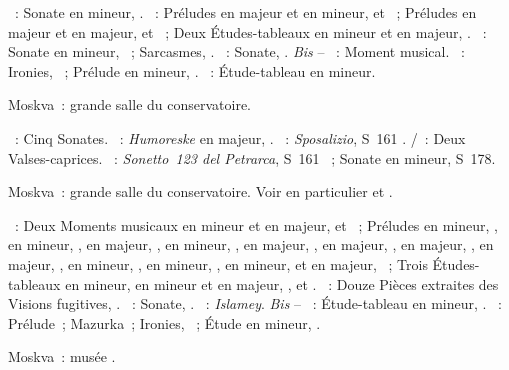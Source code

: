 \begin{description}
 \textsc{\Glazounov{}}~: Sonate en \kB \Flat mineur, .
 \textsc{\Rachmaninov{}}~: Préludes en \kD majeur et en \kC mineur,
   et ~; Préludes en \kE majeur et en \kG
 majeur,   et ~; Deux Études-tableaux en \kA
 mineur et en \kE \Flat majeur, .
 \textsc{\Prokofiev{}}~: Sonate en \kA mineur, ~; Sarcasmes,
 .
 \textsc{\Scriabine{}}~: Sonate, .
 \emph{Bis} -- \textsc{\Rachmaninov{}}~: Moment musical.
 \textsc{\Scriabine{}}~: Ironies,  ~; Prélude en \kC
 mineur, .
 \textsc{\Rachmaninov{}}~: Étude-tableau en \kA mineur.
 \item[\DateWithWeekDay{1946-11-12}]
 Moskva~: grande salle du conservatoire.

 \textsc{\Scarlatti{}}~: Cinq Sonates.
 \textsc{\Schumann{}}~: \emph{Humoreske} en \kB \Flat majeur, .
 \textsc{\Liszt{}}~: \emph{Sposalizio}, S~161 .
 \textsc{\Schubert{}/\Liszt{}}~: Deux Valses-caprices.
 \textsc{\Liszt{}}~: \emph{Sonetto~123 del Petrarca}, S~161 ~;
 Sonate en \kB mineur, S~178.
 \item[\DateWithWeekDay{1946-11-18}]
 Moskva~: grande salle du conservatoire.
 Voir en particulier \citet[p.~443]{Milshteyn82a} et
 \citet[p.~395]{Nikonovich08}.

 \textsc{\Rachmaninov{}}~: Deux Moments musicaux en \kB mineur et en \kD
 \Flat majeur,   et ~; Préludes en \kC \Sharp
 mineur,  , en \kF \Sharp mineur,  , en
 \kD majeur,  , en \kC mineur,  , en
 \kA \Flat majeur,  , en \kE \Flat majeur, 
 , en \kE majeur,  , en \kG majeur, 
 , en \kA mineur,  , en \kG \Sharp mineur,
  , en \kE \Flat mineur,   et en \kB
 \Flat majeur,  ~; Trois Études-tableaux en \kG mineur,
 en \kB mineur et en \kE \Flat majeur,  , 
  et  .
 \textsc{\Prokofiev{}}~: Douze Pièces extraites des Visions fugitives,
 .
 \textsc{\Scriabine{}}~: Sonate, .
 \textsc{\Balakirev{}}~: \emph{Islamey}.
 \emph{Bis} -- \textsc{\Rachmaninov{}}~: Étude-tableau en \kB mineur,
  .
 \textsc{\Scriabine{}}~: Prélude~; Mazurka~; Ironies,  ~;
 Étude en \kD \Sharp mineur,  .
 \item[\DateWithWeekDay{1946-11-24}]
 Moskva~: musée \Scriabine{}.


\end{description}
